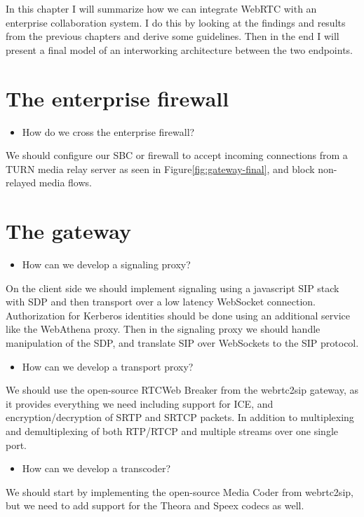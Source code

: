 In this chapter I will summarize how we can integrate WebRTC with an enterprise collaboration system. I do this by looking at the findings and results from the previous chapters and derive some guidelines. Then in the end I will present a final model of an interworking architecture between the two endpoints.

\section{The enterprise firewall}

\begin{itemize}
\item How do we cross the enterprise firewall?
\end{itemize}
We should configure our SBC or firewall to accept incoming connections from a TURN media relay server as seen in Figure\ref{fig:gateway-final}, and block non-relayed media flows.

\section{The gateway}

\begin{itemize}
\item How can we develop a signaling proxy?
\end{itemize}
On the client side we should implement signaling using a javascript SIP stack with SDP and then transport over a low latency WebSocket connection. Authorization for Kerberos identities should be done using an additional service like the WebAthena proxy. Then in the signaling proxy we should handle manipulation of the SDP, and translate SIP over WebSockets to the SIP protocol.

\begin{itemize}
\item How can we develop a transport proxy?
\end{itemize}
We should use the open-source RTCWeb Breaker from the webrtc2sip gateway, as it provides everything we need including support for ICE, and encryption/decryption of SRTP and SRTCP packets. In addition to multiplexing and demultiplexing of both RTP/RTCP and multiple streams over one single port.

\begin{itemize}
\item How can we develop a transcoder?
\end{itemize}
We should start by implementing the open-source Media Coder from webrtc2sip, but we need to add support for the Theora and Speex codecs as well.

